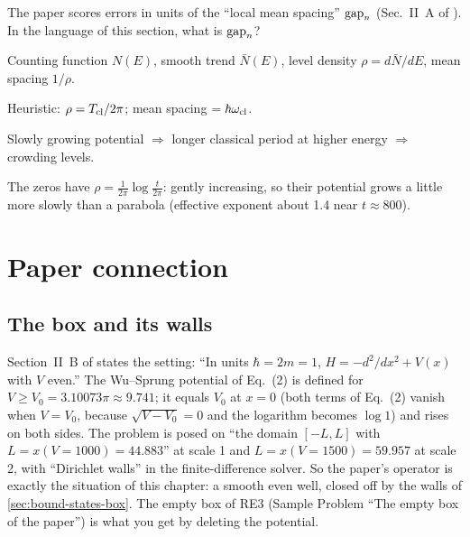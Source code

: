 \begin{checkpoint}
The paper scores errors in units of the ``local mean spacing'' $\mathrm{gap}_n$ (Sec.~II~A of \cite{soniR1}). In the language of this section, what is $\mathrm{gap}_n$?
\end{checkpoint}

\begin{keyideas}
\item Counting function $N(E)$, smooth trend $\bar N(E)$, level density $\rho=d\bar N/dE$, mean spacing $1/\rho$.
\item Heuristic: $\rho=T_{\rm cl}/2\pi$; mean spacing $=\hbar\omega_{\rm cl}$.
\item Slowly growing potential $\Rightarrow$ longer classical period at higher energy $\Rightarrow$ crowding levels.
\item The zeros have $\rho=\frac1{2\pi}\log\frac{t}{2\pi}$: gently increasing, so their potential grows a little more slowly than a parabola (effective exponent about 1.4 near $t\approx800$).
\end{keyideas}

\section{Paper connection}\label{sec:bound-states-paper}

\subsection{The box and its walls}

Section~II~B of \cite{soniR1} states the setting: ``In units $\hbar=2m=1$, $H=-d^2/dx^2+V(x)$ with $V$ even.'' The Wu--Sprung potential of Eq.~(2) is defined for $V\ge V_0=3.10073\pi\approx9.741$; it equals $V_0$ at $x=0$ (both terms of Eq.~(2) vanish when $V=V_0$, because $\sqrt{V-V_0}=0$ and the logarithm becomes $\log1$) and rises on both sides. The problem is posed on ``the domain $[-L,L]$ with $L=x(V{=}1000)=44.883$'' at scale 1 and $L=x(V{=}1500)=59.957$ at scale 2, with ``Dirichlet walls'' in the finite-difference solver. So the paper's operator is exactly the situation of this chapter: a smooth even well, closed off by the walls of \cref{sec:bound-states-box}. The empty box of RE3 (Sample Problem ``The empty box of the paper'') is what you get by deleting the potential.

